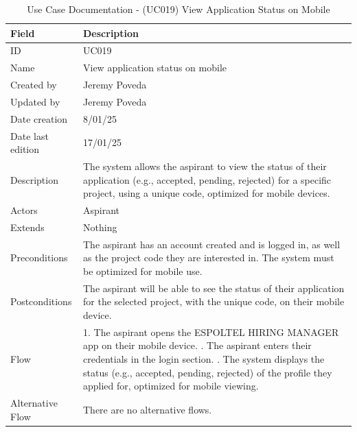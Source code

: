\documentclass{scrreprt}
\begin{document}
\begin{table}[H]
	\centering \small
	\begin{tabular}{|p{3cm}|p{10cm}|}
		\hline
		\textbf{Field} & \textbf{Description} \\ \hline
		ID & UC019 \\ \hline
		Name & View application status on mobile \\ \hline
		Created by & Jeremy Poveda \\ \hline
		Updated by & Jeremy Poveda \\ \hline
		Date creation & 8/01/25 \\ \hline
		Date last edition & 17/01/25 \\ \hline
		Description & The system allows the aspirant to view the status of their application (e.g., accepted, pending, rejected) for a specific project, using a unique code, optimized for mobile devices. \\ \hline
		Actors & Aspirant \\ \hline
		Extends & Nothing \\ \hline
		Preconditions & The aspirant has an account created and is logged in, as well as the project code they are interested in. The system must be optimized for mobile use. \\ \hline
		Postconditions & The aspirant will be able to see the status of their application for the selected project, with the unique code, on their mobile device. \\ \hline
		Flow & 
		1. The aspirant opens the ESPOLTEL HIRING MANAGER app on their mobile device. \newline
		2. The aspirant enters their credentials in the login section. \newline
		5. The system displays the status (e.g., accepted, pending, rejected) of the profile they applied for, optimized for mobile viewing. 
		\\ \hline
		Alternative Flow & There are no alternative flows. \\ \hline
	\end{tabular}
	\caption{Use Case Documentation - (UC019) View Application Status on Mobile}
	\label{table:UC019}
\end{table}
\end{document}
